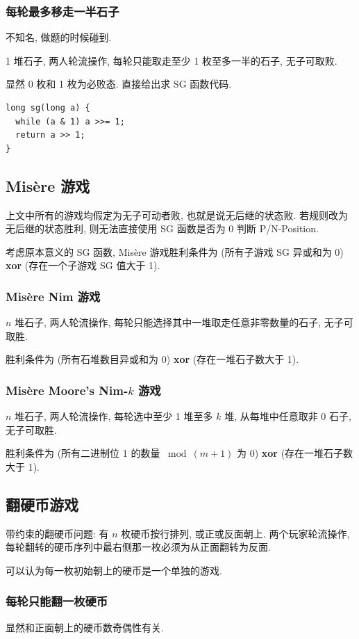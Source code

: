 \subsubsection{每轮最多移走一半石子}
不知名, 做题的时候碰到.

1 堆石子, 两人轮流操作, 每轮只能取走至少 1 枚至多一半的石子, 无子可取败.

显然 0 枚和 1 枚为必败态. 直接给出求 SG 函数代码.

\begin{lstlisting}
long sg(long a) {
  while (a & 1) a >>= 1;
  return a >> 1;
}
\end{lstlisting}

\subsection{Mis\`ere 游戏}
上文中所有的游戏均假定为无子可动者败, 也就是说无后继的状态败. 若规则改为无后继的状态胜利, 则无法直接使用 SG 函数是否为 0 判断 P/N-Position.

考虑原本意义的 SG 函数, Mis\`ere 游戏胜利条件为 (所有子游戏 SG 异或和为 0) \textbf{xor} (存在一个子游戏 SG 值大于 1).

\subsubsection{Mis\`ere Nim 游戏}
$n$ 堆石子, 两人轮流操作, 每轮只能选择其中一堆取走任意非零数量的石子, 无子可取胜.

胜利条件为 (所有石堆数目异或和为 0) \textbf{xor} (存在一堆石子数大于 1).

\subsubsection{Mis\`ere Moore's Nim-\(k\) 游戏}
$n$ 堆石子, 两人轮流操作, 每轮选中至少 1 堆至多 $k$ 堆, 从每堆中任意取非 0 石子, 无子可取胜.

胜利条件为 (所有二进制位 1 的数量 $\bmod (m+1)$ 为 0) \textbf{xor} (存在一堆石子数大于 1).

\clearpage
\subsection{翻硬币游戏}
带约束的翻硬币问题: 有 $n$ 枚硬币按行排列, 或正或反面朝上. 两个玩家轮流操作, 每轮翻转的硬币序列中最右侧那一枚必须为从正面翻转为反面.

可以认为每一枚初始朝上的硬币是一个单独的游戏.

\subsubsection{每轮只能翻一枚硬币}
显然和正面朝上的硬币数奇偶性有关.

